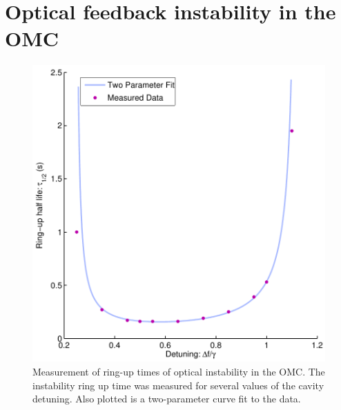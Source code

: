 

\section{Optical feedback instability in the OMC}
\begin{figure}
  \begin{center}
  \leavevmode
  \includegraphics{figs-omc/raddamping.pdf}
  \end{center}
  \caption[Measurement of ring-up times of optical instability in the OMC.]{Measurement of ring-up times of optical instability in the OMC. The instability ring up time was measured for several values of the cavity detuning. Also plotted is a two-parameter curve fit to the data.}
  \label{fig:raddamping}
\end{figure}
